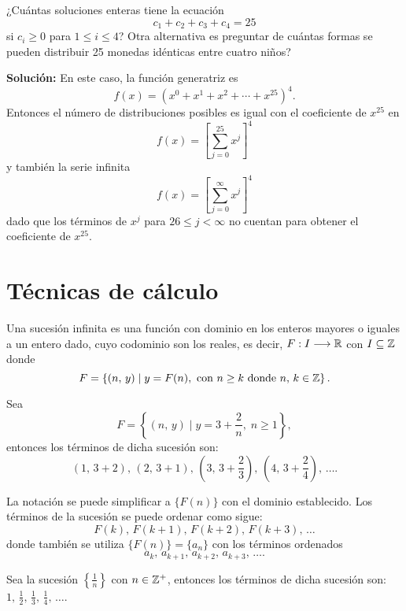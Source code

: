 \begin{myexample}
    ¿Cuántas soluciones enteras tiene la ecuación
    $$c_1 + c_2 + c_3 + c_4 = 25$$
    si $c_i \geq 0$ para $1 \leq i \leq 4$? Otra alternativa es preguntar de cuántas formas se pueden distribuir 25 monedas idénticas entre cuatro niños?

    \tcblower
    \textbf{\color{jblueleft}Solución:} En este caso, la función generatriz es
    $$f(x) = \left( x^0 + x^1 + x^2 + \cdots + x^{25} \right)^4.$$
    Entonces el número de distribuciones posibles es igual con el coeficiente de $x^{25}$ en
    $$f(x) = \left[ \sum_{j=0}^{25} x^j \right]^4$$
    y también la serie infinita
    $$f(x) = \left[ \sum_{j=0}^{\infty} x^j \right]^4$$
    dado que los términos de $x^j$ para $26 \leq j < \infty$ no cuentan para obtener el coeficiente de $x^{25}$.
\end{myexample}

\section{Técnicas de cálculo}

\begin{definicion}{}{}
    Una sucesión infinita es una función con dominio en los enteros mayores o iguales a un entero dado, cuyo codominio son los reales, es decir, $F: I \longrightarrow \RR$ con $I \subseteq \ZZ$ donde
    $$F = \left\{ (n, \, y) \mid y = F(n), \text{ con } n \geq k \text{ donde } n, \, k \in \ZZ \right\}.$$
\end{definicion}

\begin{myexample}
    Sea
    $$F = \left\{ (n, \, y) \mid y = 3 + \frac{2}{n}, \; n \geq 1 \right\},$$
    entonces los términos de dicha sucesión son:
    $$(1, \, 3+2), \, (2, \, 3+1), \, \left(3, \, 3+\frac{2}{3}\right), \, \left(4, \, 3+\frac{2}{4}\right), \, \dots.$$
\end{myexample}

\begin{notation*}{}
    La notación se puede simplificar a $\{F(n)\}$ con el dominio establecido. Los términos de la sucesión se puede ordenar como sigue:
    $$F(k), \, F(k+1), \, F(k+2), \, F(k+3), \, \dots$$
    donde también se utiliza $\{F(n)\} = \{a_n\}$ con los términos ordenados
    $$a_k, \, a_{k+1}, \, a_{k+2}, \, a_{k+3}, \, \dots.$$
\end{notation*}

\begin{myexample}
    Sea la sucesión $\displaystyle \left\{ \frac{1}{n} \right\}$ con $n \in \ZZ[+]$, entonces los términos de dicha sucesión son: $\displaystyle 1, \, \frac{1}{2}, \, \frac{1}{3}, \, \frac{1}{4}, \, \dots$.
\end{myexample}

